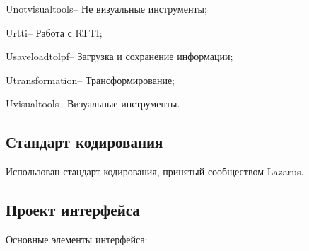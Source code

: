\documentclass[a4paper,12pt]{article}
\begin{document}
Unotvisualtools-- Не визуальные инструменты;

Urtti-- Работа с RTTI;

Usaveloadtolpf-- Загрузка и сохранение информации;

Utransformation-- Трансформирование;

Uvisualtools-- Визуальные инструменты.


\subsection{Стандарт кодирования}

Использован стандарт кодирования, принятый сообществом Lazarus. 


\subsection{Проект интерфейса}

Основные элементы интерфейса:
\end{document}
